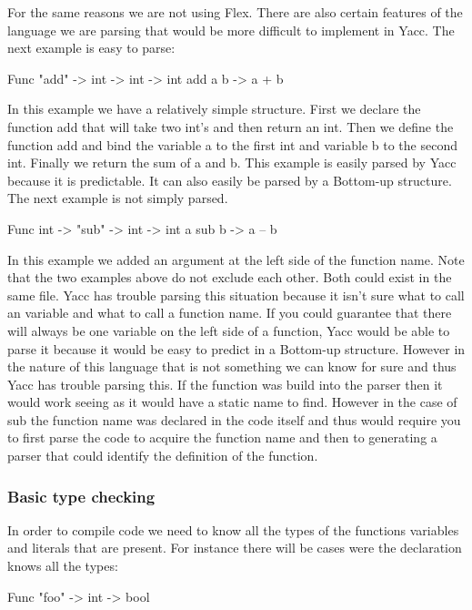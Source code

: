 For the same reasons we are not using Flex. There are also certain features of the language we are parsing that would be more difficult to implement in Yacc. The next example is easy to parse: 

\begin{code}
	Func "add" -> int -> int -> int 
	add a b -> a + b 
\end{code}

In this example we have a relatively simple structure. First we declare the function add that will take two int’s and then return an int. Then we define the function add and bind the variable a to the first int and variable b to the second int. Finally we return the sum of a and b. This example is easily parsed by Yacc because it is predictable. It can also easily be parsed by a Bottom-up structure. The next example is not simply parsed. 

\begin{code}
	Func int -> "sub" -> int -> int 
	a sub b -> a – b 
\end{code}

In this example we added an argument at the left side of the function name. Note that the two examples above do not exclude each other. Both could exist in the same file. Yacc has trouble parsing this situation because it isn’t sure what to call an variable and what to call a function name. If you could guarantee that there will always be one variable on the left side of a function, Yacc would be able to parse it because it would be easy to predict in a Bottom-up structure. However in the nature of this language that is not something we can know for sure and thus Yacc has trouble parsing this. If the function was build into the parser then it would work seeing as it would have a static name to find. However in the case of sub the function name was declared in the code itself and thus would require you to first parse the code to acquire the function name and then to generating a parser that could identify the definition of the function. 

\subsubsection{Basic type checking}

In order to compile code we need to know all the types of the functions variables and literals that are present. For instance there will be cases were the declaration knows all the types: 

\begin{code}
	Func "foo" -> int -> bool  
\end{code}

